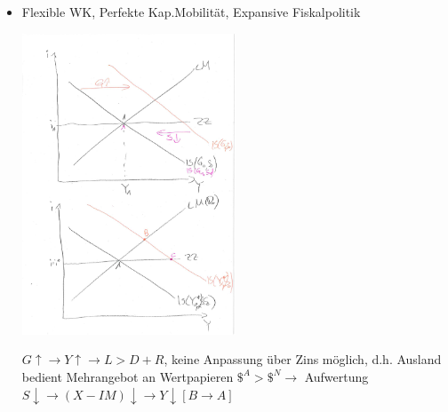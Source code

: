\documentclass{scrartcl}
\begin{document}
\begin{enumerate}[a)]
\begin{itemize}
\item Flexible WK, Perfekte Kap.Mobilit\"{a}t, Expansive Fiskalpolitik
    \begin{center}
      \includegraphics[width=0.5\textwidth]{Bilder/MF6.pdf}
    \end{center}
    $G\uparrow \rightarrow Y \uparrow \rightarrow L > D+R$, keine Anpassung \"{u}ber Zins m\"{o}glich, d.h. Ausland bedient Mehrangebot an Wertpapieren $\$^{A}>\$^{N} \rightarrow $ Aufwertung $S\downarrow \rightarrow (X-IM)\downarrow \rightarrow Y \downarrow [B\rightarrow A]$
\end{itemize}


\end{enumerate}
\end{document}
